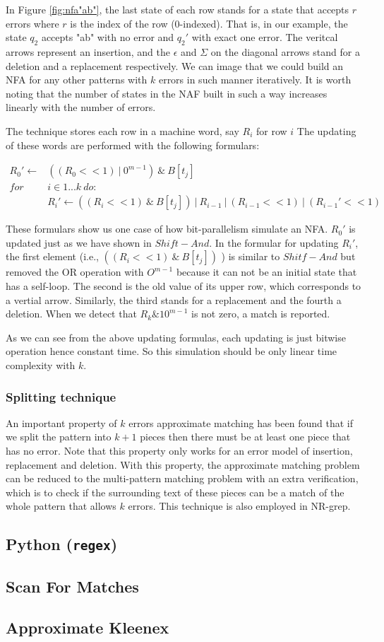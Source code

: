 In Figure \ref{fig:nfa"ab"}, the last state of each row stands for a state that accepts $r$ errors where $r$ is the index of the row (0-indexed). That is, in our example, the state $q_2$ accepts "ab" with no error and $q_2'$  with exact one error. The veritcal arrows represent an insertion, and the $\epsilon$ and $\Sigma$ on the diagonal arrows stand for a deletion and a replacement respectively. We can image that we could build an NFA for any other patterns with $k$ errors in such manner iteratively. It is worth noting that the number of states in the NAF built in such a way increases linearly with the number of errors.

The technique stores each row in a machine word, say $R_i$ for row $i$ %
The updating of these words are performed with the following formulars: 

\begin{align*}
R_0' \leftarrow & ((R_0 << 1) \ |\ 0^{m-1}) \ \& \ B[t_j] \\
for \ &i \in 1...k \ do:  \\
	& R_i' \leftarrow ((R_i << 1) \ \& \ B[t_j] ) \ |\ R_{i-1} \ | \ (R_{i-1} << 1 ) \ |\ (R_{i-1}' << 1)
\end{align*}

These formulars show us one case of how bit-parallelism simulate an NFA. $R_0'$ is updated just as we have shown in $Shift-And$. In the formular for updating $R_i'$, the first element (i.e., $((R_i << 1) \ \& \ B[t_j] ) $ ) is similar to $Shitf-And$ but removed the OR operation with $O^{m-1}$ because it can not be an initial state that has a self-loop. The second is the old value of its upper row, which corresponds to a vertial arrow. Similarly, the third stands for a replacement and the fourth a deletion. When we detect that $R_k \& 10^{m-1}$ is not zero, a match is reported.  

As we can see from the above updating formulas, each updating is just bitwise operation hence constant time. So this simulation should be only linear time complexity with $k$.
 

\subsubsection{Splitting technique}
An important property of $k$ errors approximate matching has been found that if we split the pattern into $k+1$ pieces then there must be at least one piece that has no error\cite{wu1992}. Note that this property only works for an error model of insertion, replacement and deletion. With this property, the approximate matching problem can be reduced to the multi-pattern matching problem with an extra verification, which is to check if the surrounding text of these pieces can be a match of the whole pattern that allows $k$ errors. This technique is also employed in NR-grep. 


 
\subsection{Python (\texttt{regex})}

\subsection{Scan For Matches}


\subsection{Approximate Kleenex}
